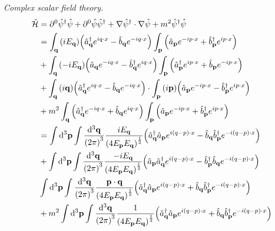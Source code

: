 \documentclass{report}
\begin{document}
\begin{subquests}
	\item \emph{Complex scalar field theory.}
	\begin{align*}
		\hat{\mathcal H} & = \partial^0\hat{\psi}^{\dagger}\hat{\psi} + \partial^0\hat{\psi}\hat{\psi}^{\dagger} + \nabla\hat{\psi}^{\dagger}\cdot\nabla\hat{\psi} + m^2 \hat{\psi}^{\dagger}\hat{\psi} \\
		& = \int_{\vb q}\pqty{iE_{\vb q}}\pqty{\hat{a}^{\dagger}_{\vb q}e^{i q \cdot x} - \hat{b}_{\vb q}e^{-i q \cdot x}} \int_{\vb p} \pqty{\hat{a}_{\vb p}e^{-i p \cdot x} + \hat{b}^{\dagger}_{\vb p}e^{i p \cdot x}} \\
		& + \int_{\vb q} \pqty{-iE_{\vb q}}\pqty{\hat{a}_{\vb q}e^{-i q \cdot x} - \hat{b}^{\dagger}_{\vb q}e^{i q \cdot x}}\int_{\vb p}\pqty{\hat{a}^{\dagger}_{\vb p}e^{i p \cdot x} + \hat{b}_{\vb p}e^{-i p \cdot x}}  \\
		& + \int_{\vb q}\pqty{i\vb q}\pqty{\hat{a}^{\dagger}_{\vb q}e^{i q \cdot x} - \hat{b}_{\vb q}e^{-i q \cdot x}} \cdot \int_{\vb p} \pqty{i\vb p}\pqty{\hat{a}_{\vb p}e^{-i p \cdot x} - \hat{b}^{\dagger}_{\vb p}e^{i p \cdot x}}\\
		& + m^2 \int_{\vb q}\pqty{\hat{a}^{\dagger}_{\vb q}e^{-i q \cdot x} + \hat{b}_{\vb q}e^{i q \cdot x}}\int_{\vb p} \pqty{\hat{a}_{\vb p}e^{-i p \cdot x} + \hat{b}^{\dagger}_{\vb p}e^{i p \cdot x}} \\
		& = \int\dd^3{\vb p}\int\frac{\dd^3{\vb q}}{\pqty{2\pi}^3}\frac{iE_{\vb q}}{\pqty{4E_{\vb p}E_{\vb q}}^{\frac{1}{2}}}\pqty{\hat{a}^{\dagger}_{\vb q}\hat{a}_{\vb p}e^{i(q-p)\cdot x} - \hat{b}_{\vb q}\hat{b}^{\dagger}_{\vb p}e^{- i(q -p)\cdot x}} \\
		& + \int\dd^3{\vb p}\int\frac{\dd^3{\vb q}}{\pqty{2\pi}^3}\frac{-iE_{\vb q}}{\pqty{4E_{\vb p}E_{\vb q}}^{\frac{1}{2}}}\pqty{\hat{a}_{\vb p}\hat{a}^{\dagger}_{\vb q}e^{i(q-p)\cdot x} - \hat{b}^{\dagger}_{\vb p}\hat{b}_{\vb q}e^{-i(q-p)\cdot x}} \\
		&  \int\dd^3{\vb p}\int\frac{\dd^3{\vb q}}{\pqty{2\pi}^3}\frac{\vb p \cdot \vb q}{\pqty{4E_{\vb p}E_{\vb q}}^{\frac{1}{2}}}\pqty{\hat{a}^{\dagger}_{\vb q}\hat{a}_{\vb p}e^{i(q-p)\cdot x} + \hat{b}_{\vb q}\hat{b}^{\dagger}_{\vb p}e^{-i(q-p)\cdot x}} \\
		& + m^2 \int\dd^3{\vb p}\int\frac{\dd^3{\vb q}}{\pqty{2\pi}^3}\frac{1}{\pqty{4E_{\vb p}E_{\vb q}}^{\frac{1}{2}}}\pqty{\hat{a}^{\dagger}_{\vb q}\hat{a}_{\vb p}e^{i(q-p)\cdot x} + \hat{b}_{\vb q}\hat{b}^{\dagger}_{\vb p}e^{-i(q-p)\cdot x}}
	\end{align*}


\end{subquests}
\end{document}
